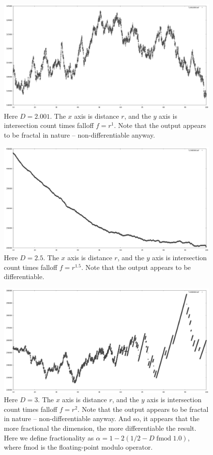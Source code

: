 \documentclass[12pt]{article}
\begin{document}
\begin{figure} 
\centering
  \includegraphics[width = 4 in]{2.001_pow.png}
  \caption{
Here $D = 2.001$.
The $x$ axis is distance $r$, and the $y$ axis is intersection count times falloff $f = r^1$.
Note that the output appears to be fractal in nature -- non-differentiable anyway.
}
\end{figure}

\begin{figure} 
\centering
  \includegraphics[width = 4 in]{2.5_pow.png}
  \caption{
Here $D = 2.5$.
The $x$ axis is distance $r$, and the $y$ axis is intersection count times falloff $f = r^{1.5}$.
Note that the output appears to be differentiable.
}
\end{figure}

\begin{figure} 
\centering
  \includegraphics[width = 4 in]{3.0_pow.png}
  \caption{
Here $D = 3$.
The $x$ axis is distance $r$, and the $y$ axis is intersection count times falloff $f = r^2$.
Note that the output appears to be fractal in nature -- non-differentiable anyway.
And so, it appears that the more fractional the dimension, the more differentiable the result.
Here we define fractionality as $\alpha = 1 - 2 (1/2 - D\;\textrm{fmod}\;1.0)$, where $\textrm{fmod}$ is the floating-point modulo operator.
}
\end{figure}
\end{document}
